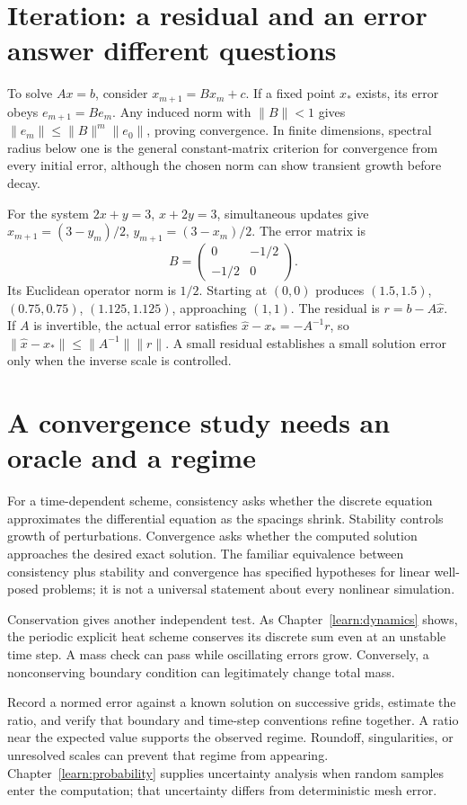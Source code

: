 \section{Iteration: a residual and an error answer different questions}
To solve $Ax=b$, consider $x_{m+1}=Bx_m+c$. If a fixed point $x_*$
exists, its error obeys $e_{m+1}=Be_m$. Any induced norm with $\|B\|<1$
gives $\|e_m\|\leq\|B\|^m\|e_0\|$, proving convergence. In finite
dimensions, spectral radius below one is the general constant-matrix criterion
for convergence from every initial error, although the chosen norm can show
transient growth before decay.

For the system $2x+y=3$, $x+2y=3$, simultaneous updates give
$x_{m+1}=(3-y_m)/2$, $y_{m+1}=(3-x_m)/2$. The error matrix is
\[
 B=\begin{pmatrix}0&-1/2\\-1/2&0\end{pmatrix}.
\]
Its Euclidean operator norm is $1/2$. Starting at $(0,0)$ produces
$(1.5,1.5)$, $(0.75,0.75)$, $(1.125,1.125)$, approaching $(1,1)$.
The residual is $r=b-A\widehat x$. If $A$ is invertible, the actual
error satisfies $\widehat x-x_*=-A^{-1}r$, so
$\|\widehat x-x_*\|\leq\|A^{-1}\|\|r\|$. A small residual establishes
a small solution error only when the inverse scale is controlled.

\section{A convergence study needs an oracle and a regime}
For a time-dependent scheme, consistency asks whether the discrete equation
approximates the differential equation as the spacings shrink. Stability
controls growth of perturbations. Convergence asks whether the computed
solution approaches the desired exact solution. The familiar equivalence
between consistency plus stability and convergence has specified hypotheses
for linear well-posed problems; it is not a universal statement about every
nonlinear simulation.

Conservation gives another independent test. As
Chapter~\ref{learn:dynamics} shows, the periodic explicit heat scheme
conserves its discrete sum even at an unstable time step. A mass check can
pass while oscillating errors grow. Conversely, a nonconserving boundary
condition can legitimately change total mass.

Record a normed error against a known solution on successive grids, estimate
the ratio, and verify that boundary and time-step conventions refine together.
A ratio near the expected value supports the observed regime. Roundoff,
singularities, or unresolved scales can prevent that regime from appearing.
Chapter~\ref{learn:probability} supplies uncertainty analysis when random
samples enter the computation; that uncertainty differs from deterministic
mesh error.

